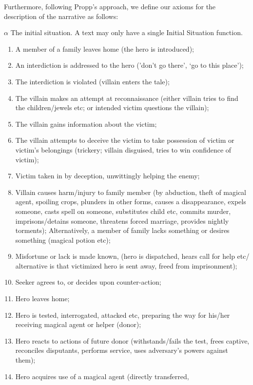 \documentclass[10pt,a4paper]{article}
\begin{document}
Furthermore, following Propp's approach, we define our axioms for the description of the narrative as follows: 

	 $\alpha$ The initial situation. A text may only have a single Initial Situation function. 

\begin{enumerate}

	\item  A member of a family leaves home (the hero is introduced);
 	\item  An interdiction is addressed to the hero (’don’t go there’, ‘go to
this place’);
	\item  The interdiction is violated (villain enters the tale);
	\item  The villain makes an attempt at reconnaissance (either villain
tries to find the children/jewels etc; or intended victim questions
the villain);
 	\item  The villain gains information about the victim;
 	\item  The villain attempts to deceive the victim to take possession of
victim or victim’s belongings (trickery; villain disguised, tries to win
confidence of victim);
 	\item  Victim taken in by deception, unwittingly helping the enemy;
 	\item  Villain causes harm/injury to family member (by abduction,
theft of magical agent, spoiling crops, plunders in other forms,
causes a disappearance, expels someone, casts spell on someone,
substitutes child etc, commits murder, imprisons/detains someone,
threatens forced marriage, provides nightly torments); Alternatively,
a member of family lacks something or desires something (magical
potion etc);
 	\item  Misfortune or lack is made known, (hero is dispatched, hears
call for help etc/ alternative is that victimized hero is sent away,
freed from imprisonment);
 	\item  Seeker agrees to, or decides upon counter-action;
	\item  Hero leaves home;
 	\item  Hero is tested, interrogated, attacked etc, preparing the way
for his/her receiving magical agent or helper (donor);
 	\item  Hero reacts to actions of future donor (withstands/fails the
test, frees captive, reconciles disputants, performs service, uses
adversary’s powers against them);
 \item  Hero acquires use of a magical agent (directly transferred,

\end{enumerate}
\end{document}
